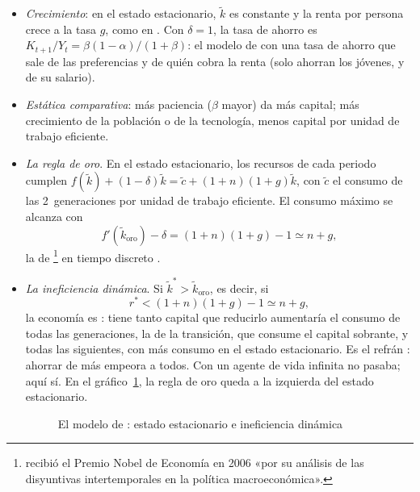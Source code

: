 \documentclass[11pt]{article}
\begin{document}
\begin{itemize}
\item \emph{Crecimiento}: en el estado estacionario, $\tilde k$ es constante y la renta por persona crece a la tasa $g$, como en . Con $\delta=1$, la tasa de ahorro es $K_{t+1}/Y_t=\beta(1-\alpha)/(1+\beta)$: el modelo de  con una tasa de ahorro que sale de las preferencias y de quién cobra la renta (solo ahorran los jóvenes, y de su salario).
\item \emph{Estática comparativa}: más paciencia ($\beta$ mayor) da más capital; más crecimiento de la población o de la tecnología, menos capital por unidad de trabajo eficiente.
\item \emph{La regla de oro}. En el estado estacionario, los recursos de cada periodo cumplen $f(\tilde k)+(1-\delta)\tilde k=\tilde c+(1+n)(1+g)\tilde k$, con $\tilde c$ el consumo de las 2~generaciones por unidad de trabajo eficiente. El consumo máximo se alcanza con
  \begin{equation*}
  f'(\tilde k_{\mathrm{oro}})-\delta=(1+n)(1+g)-1\simeq n+g,
  \end{equation*}
  la  de \textcite{Phelps1961}\footnote{ recibió el Premio Nobel de Economía en 2006 «por su análisis de las disyuntivas intertemporales en la política macroeconómica»\nocite{Nobel2006Phelps}.} en tiempo discreto .
\item \emph{La ineficiencia dinámica}. Si $\tilde k^*>\tilde k_{\mathrm{oro}}$, es decir, si
  \begin{equation*}
  r^*<(1+n)(1+g)-1\simeq n+g,
  \end{equation*}
  la economía es : tiene tanto capital que reducirlo aumentaría el consumo de todas las generaciones, la de la transición, que consume el capital sobrante, y todas las siguientes, con más consumo en el estado estacionario. Es el refrán : ahorrar de más empeora a todos. Con un agente de vida infinita no pasaba; aquí sí. En el gráfico~\ref{fig:diamond}, la regla de oro queda a la izquierda del estado estacionario.
  \begin{figure}[H]
  \centering
  \caption{El modelo de : estado estacionario e ineficiencia dinámica}\label{fig:diamond}

\end{figure}
\end{itemize}
\end{document}
